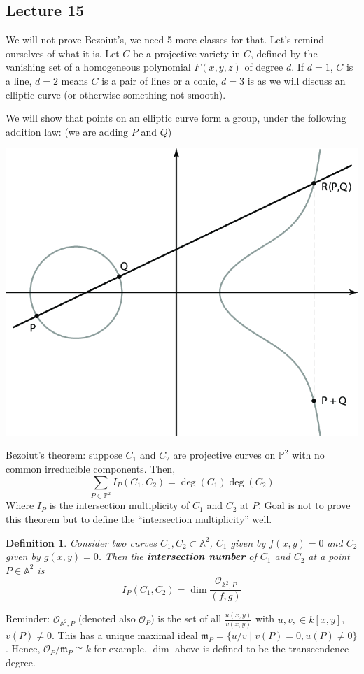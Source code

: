 \documentclass[12pt]{article}
\renewcommand{\P}{\mathbb{P}}
\newcommand{\A}{\mathbb{A}}
\newcommand{\m}{\mathfrak{m}}
\renewcommand{\O}{\mathcal{O}}
\newtheorem{definition}{Definition}[section]
\begin{document}
    \subsection{Lecture 15}
    We will not prove Bezoiut's, we need 5 more classes for that. Let's remind ourselves of what it is. Let $C$ be a projective variety in $C$, defined by the vanishing set of a homogeneous polynomial $F(x, y, z)$ of degree $d$. If $d = 1$, $C$ is a line, $d= 2$ means $C$ is a pair of lines or a conic, $d = 3$ is as we will discuss an elliptic curve (or otherwise something not smooth).\par 
    We will show that points on an elliptic curve form a group, under the following addition law: (we are adding $P$ and $Q$)
    \begin{center}
        \includegraphics[width = 0.6\linewidth]{add_elliptic.png}
    \end{center}
    Bezoiut's theorem: suppose $C_1$ and $C_2$ are projective curves on $\P^2$ with no common irreducible components. Then, 
    $$\sum_{P \in \P^2}I_P(C_1, C_2) = \deg(C_1)\deg(C_2)$$
    Where $I_P$ is the intersection multiplicity of $C_1$ and $C_2$ at $P$. Goal is not to prove this theorem but to define the ``intersection multiplicity'' well. \par 
    \begin{definition}
        Consider two curves $C_1, C_2 \subset \A^2$, $C_1$ given by $f(x, y) = 0$ and $C_2$ given by $g(x, y) = 0$. Then the \textbf{intersection number} of $C_1$ and $C_2$ at a point $P \in \A^2$ is 
        $$I_P(C_1, C_2) = \dim \frac{\O_{\A^2, P}}{(f, g)}$$
    \end{definition}
    Reminder: $\O_{\A^2, P}$ (denoted also $\O_P$) is the set of all $\frac{u(x, y)}{v(x, y)}$ with $u, v, \in k[x, y]$, $v(P) \neq 0$. This has a unique maximal ideal $\m_P = \{u/v \mid v(P) = 0, u(P) \neq 0\}$. Hence, $\O_P/\m_P \cong k$ for example. $\dim$ above is defined to be the transcendence degree. \par 
\end{document}
